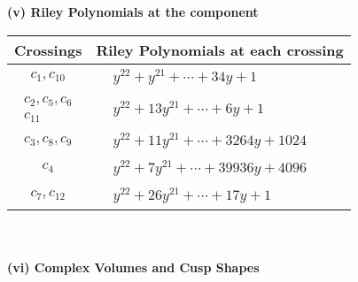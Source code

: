 \documentclass[1p]{elsarticle_modified}
\theoremstyle{definition}
\begin{document}
\newpage\renewcommand{\arraystretch}{1}
\flushleft \textbf{(v) Riley Polynomials at the component}\newline \\
\begin{tabular}{m{50pt}|m{274pt}}
Crossings & \hspace{64pt}Riley Polynomials at each crossing \\
\hline $$\begin{aligned}c_{1},c_{10}\end{aligned}$$&$\begin{aligned}
&y^{22}+y^{21}+\cdots+34 y+1
\end{aligned}$\\
\hline $$\begin{aligned}c_{2},c_{5},c_{6}\\c_{11}\end{aligned}$$&$\begin{aligned}
&y^{22}+13 y^{21}+\cdots+6 y+1
\end{aligned}$\\
\hline $$\begin{aligned}c_{3},c_{8},c_{9}\end{aligned}$$&$\begin{aligned}
&y^{22}+11 y^{21}+\cdots+3264 y+1024
\end{aligned}$\\
\hline $$\begin{aligned}c_{4}\end{aligned}$$&$\begin{aligned}
&y^{22}+7 y^{21}+\cdots+39936 y+4096
\end{aligned}$\\
\hline $$\begin{aligned}c_{7},c_{12}\end{aligned}$$&$\begin{aligned}
&y^{22}+26 y^{21}+\cdots+17 y+1
\end{aligned}$\\
\hline
\end{tabular}\\~\\
\newpage\flushleft \textbf{(vi) Complex Volumes and Cusp Shapes}
\end{document}
